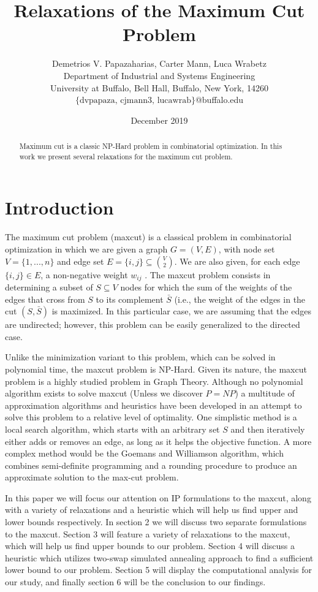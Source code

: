 \documentclass[12pt]{article}
\title{Relaxations of the Maximum Cut Problem}
\author{Demetrios V. Papazaharias, Carter Mann, Luca Wrabetz\\ \small Department of Industrial and Systems Engineering \\
\small University at Buffalo, Bell Hall, Buffalo, New York, 14260\\\small $\lbrace \text{dvpapaza, cjmann3, lucawrab}\rbrace$@buffalo.edu}
\date{December 2019}
\theoremstyle{plain}
\theoremstyle{definition}
\begin{document}
\maketitle
\begin{abstract}
    Maximum cut is a classic NP-Hard problem in combinatorial optimization. In this work we present several relaxations for the maximum cut problem. 
\end{abstract}

\clearpage
\section{Introduction}\label{sec:Introduction}
The maximum cut problem (maxcut) is a classical problem in combinatorial optimization in which we are given a graph $G = (V, E)$, with node set $V = \lbrace 1,...,n \rbrace$ and edge set $E = \lbrace i, j \rbrace \subseteq \binom{V}{2}$. We are also given, for each edge $\{i, j\} \in E$, a non-negative weight $w_{ij}$ . The maxcut problem consists in determining a subset of $S \subseteq V$ nodes for which the sum of the weights of the edges that cross from $S$ to its complement $\bar{S}$ (i.e., the weight of the edges in the cut $(S, \bar{S})$ is maximized. In this particular case, we are assuming that the edges are undirected; however, this problem can be easily generalized to the directed case.

Unlike the minimization variant to this problem, which can be solved in polynomial time, the maxcut problem is NP-Hard. Given its nature, the maxcut problem is a highly studied problem in Graph Theory. Although no polynomial algorithm exists to solve maxcut (Unless we discover $P = NP$) a multitude of approximation algorithms and heuristics have been developed in an attempt to solve this problem to a relative level of optimality. One simplistic method is a local search algorithm, which starts with an arbitrary set $S$ and then iteratively either adds or removes an edge, as long as it helps the objective function. A more complex method would be the Goemans and Williamson algorithm, which  combines semi-definite programming and a rounding procedure to produce an approximate solution to the max-cut problem.

In this paper we will focus our attention on IP formulations to the maxcut, along with a variety of relaxations and a heuristic which will help us find upper and lower bounds respectively. In section 2 we will discuss two separate formulations to the maxcut. Section 3 will feature a variety of relaxations to the maxcut, which will help us find upper bounds to our problem.  Section 4 will discuss a heuristic which utilizes two-swap simulated annealing approach to find a sufficient lower bound to our problem.  Section 5 will display the computational analysis for our study, and finally section 6 will be the conclusion to our findings.
\end{document}
